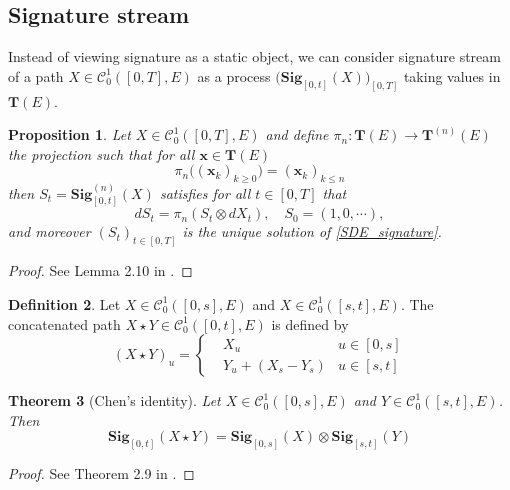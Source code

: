 \documentclass[12pt]{report}
\newtheorem{theorem}{Theorem}[chapter]
\newtheorem{proposition}[theorem]{Proposition}
\theoremstyle{definition}
\newtheorem{definition}[theorem]{Definition}
\theoremstyle{remark}
\begin{document}
\subsection{Signature stream}
Instead of viewing signature as a static object, we can consider signature stream of a path $X \in \mathcal{C}^{1}_{0}([0,T],E)$ as a process $\big(\mathbf{Sig}_{[0,t]}(X)\big)_{[0,T]}$ taking values in $\mathbf{T}(E)$.
\begin{proposition}
  Let $X \in \mathcal{C}^{1}_{0}([0,T],E)$ and define $\pi_{n} \colon \mathbf{T}(E) \to \mathbf{T}^{(n)}(E)$ the projection such that for all $\mathbf{x} \in \mathbf{T}(E)$ 
  \begin{equation}\label{projection}
    \pi_{n}\big((\mathbf{x}_{k})_{k\geq 0}\big) = (\mathbf{x}_{k})_{k\leq n}
  \end{equation}
  then $S_{t} = \mathbf{Sig}^{(n)}_{[0,t]}(X)$ satisfies for all $t \in [0,T]$ that 
  \begin{equation}\label{SDE_signature}
    dS_{t} = \pi_{n}(S_{t}\otimes dX_{t}),\quad S_{0} = (1,0,\cdots),
  \end{equation} 
  and moreover $(S_{t})_{t \in [0,T]}$ is the unique solution of \eqref{SDE_signature}. 
\end{proposition}
\begin{proof}
  See Lemma 2.10 in \cite{lyons2007differential}.
\end{proof}


\begin{definition}
  Let $X \in \mathcal{C}^{1}_{0}([0,s],E)$ and  $X \in \mathcal{C}^{1}_{0}([s,t],E)$. The concatenated path $X\star Y \in\mathcal{C}^{1}_{0}([0,t],E) $ is defined by 
  \begin{equation}
    (X\star Y)_{u} = \left\{\begin{aligned}
      &X_{u} &u\in [0,s]\\
      &Y_{u} + (X_{s} - Y_{s}) &u\in [s,t]
    \end{aligned}\right.
  \end{equation}
\end{definition}
\begin{theorem}[Chen's identity]
  Let $X \in \mathcal{C}^{1}_{0}([0,s],E)$ and  $Y \in \mathcal{C}^{1}_{0}([s,t],E)$. Then 
  \begin{equation}
    \mathbf{Sig}_{[0,t]}(X\star Y) = \mathbf{Sig}_{[0,s]}(X) \otimes \mathbf{Sig}_{[s,t]}(Y)
  \end{equation}
\end{theorem}
\begin{proof}
  See Theorem 2.9 in \cite{lyons2007differential}.
\end{proof}
\end{document}
